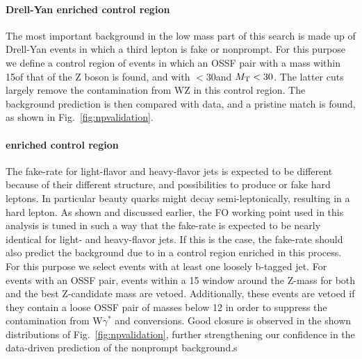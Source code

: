 \paragraph{Drell-Yan enriched
  control region}
The most important background in the low mass part of this search is
made up of Drell-Yan events in which a third lepton is fake or
nonprompt. For this purpose we define a control region of events in
which an OSSF pair with a mass within 15\GeV of that of the Z boson is
found, and with \ptmiss $< 30$\GeV and $M_{\mathrm{T}} < 30$\GeV . The latter
cuts largely remove the contamination from WZ in this control
region. The background prediction is then compared with data, and a
pristine match is found, as shown in Fig.~\ref{fig:npvalidation}. 

\paragraph{\texorpdfstring{\ttbar}{ttbar} enriched
  control region}
The fake-rate for light-flavor and heavy-flavor jets is expected to be different because of their different structure, and possibilities to produce or fake hard leptons. In particular beauty quarks might decay semi-leptonically, resulting in a hard lepton. As shown and discussed earlier, the FO working point used in this analysis is tuned in such a way that the fake-rate is expected to be nearly identical for light- and heavy-flavor jets. If this is the case, the fake-rate should also predict the background due to \ttbar  in a control region enriched in this process. For this purpose we select events with at least one loosely b-tagged jet. For events with an OSSF pair, events within a 15 \GeV window around the Z-mass for both \mlll  and the best Z-candidate mass are vetoed. Additionally, these events are vetoed if they contain a loose OSSF pair of masses below 12 \GeV in order to suppress the contamination from W$\gamma^{*}$ and conversions. Good closure is observed in the shown distributions of Fig.~\ref{fig:npvalidation}, further strengthening our confidence in the data-driven prediction of the nonprompt background.s

